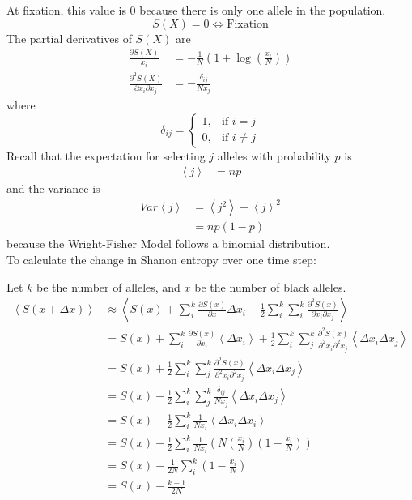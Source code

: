 \documentclass[12pt]{extarticle}
\newcommand{\<}{\langle}
\renewcommand{\>}{\rangle}
\theoremstyle{definition}
\begin{document}
\noindent At fixation, this value is $0$ because there is only one allele in the population.
\begin{equation}
    S(X) = 0 \Longleftrightarrow \text{Fixation} \nonumber
\end{equation}
The partial derivatives of $S(X)$ are
\begin{align}
    \frac{\partial S(X)}{x_i} &= -\frac{1}{N}(1 + \log(\frac{x_i}{N})) \nonumber \\
    \frac{\partial^2 S(X)}{\partial x_i \partial x_j} &= -\frac{\delta_{ij}}{Nx_j} \label{partial^2}
\end{align}
where
\begin{equation}
    \delta_{ij} = \begin{cases}
        1, & \text{if } i = j\\
        0, & \text{if } i \neq j
    \end{cases} \label{delta}
\end{equation}
Recall that the expectation for selecting $j$ alleles with probability $p$ is
\begin{align}
    \left< j \right> &= np \label{exp}
\end{align}
and the variance is
\begin{align}
    Var \left< j \right> &= \left< j^2 \right> - \left< j \right>^2 \label{var1} \\
    &= np(1-p) \label{var2}
\end{align}
because the Wright-Fisher Model follows a binomial distribution.\\

\noindent To calculate the change in Shanon entropy over one time step:

\noindent Let $k$ be the number of alleles, and $x$ be the number of black alleles.
\begin{align}
    \left< S(x + \Delta x) \right> &\approx  \left<S(x) + \sum_i^k \frac{\partial S(x)}{\partial x}\Delta x_i + \frac{1}{2}\sum_i^k \sum_i^k \frac{\partial^2 S(x)}{\partial x_i \partial x_j} \right> \label{S1} \\
    &= S(x) + \sum_i^k \frac{\partial S(x)}{\partial x_i} \left< \Delta x_i \right> + \frac{1}{2}\sum_i^k \sum_j^k \frac{\partial^2 S(x)}{\partial^2 x_i \partial^2 x_j} \left< \Delta x_i \Delta x_j \right> \label{S2} \\
    &= S(x) + \frac{1}{2}\sum_i^k \sum_j^k \frac{\partial^2 S(x)}{\partial^2 x_i \partial^2 x_j} \left< \Delta x_i \Delta x_j \right> \label{S3} \\
    &= S(x) - \frac{1}{2}\sum_i^k \sum_j^k \frac{\delta_{ij}}{Nx_j} \left< \Delta x_i \Delta x_j \right> \label{S4} \\
    &= S(x) - \frac{1}{2}\sum_i^k \frac{1}{Nx_i} \left< \Delta x_i \Delta x_i \right> \label{S5} \\
    &= S(x) - \frac{1}{2}\sum_i^k \frac{1}{Nx_i} \left(N(\frac{x_i}{N})(1 - \frac{x_i}{N})\right) \label{S6} \\
    &= S(x) - \frac{1}{2N}\sum_i^k(1 - \frac{x_i}{N}) \label{S7} \\
    &= S(x) - \frac{k - 1}{2N} \label{S8}
\end{align}
\end{document}
